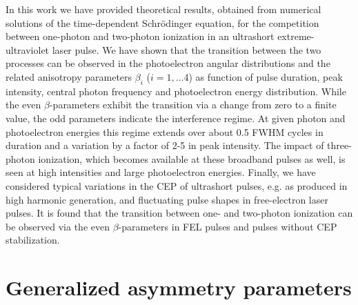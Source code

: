 In this work we have provided theoretical results, obtained from numerical solutions of the time-dependent Schr\"odinger equation, for the competition between one-photon and two-photon ionization in an ultrashort extreme-ultraviolet laser pulse. We have shown that the transition between the two processes can be observed in the photoelectron angular distributions and the related anisotropy parameters $\beta_i$ ($i = 1, \ldots 4$) as function of pulse duration, peak intensity, central photon frequency and photoelectron energy distribution. While the even $\beta$-parameters exhibit the transition via a change from zero to a finite value, the odd parameters indicate the interference regime. At given photon and photoelectron energies this regime extends over about 0.5 FWHM cycles in duration and a variation by a factor of 2-5 in peak intensity. The impact of three-photon ionization, which becomes available at these broadband pulses as well, is seen at high intensities and large photoelectron energies. Finally, we have considered typical variations in the CEP of ultrashort pulses, e.g. as produced in high harmonic generation, and fluctuating pulse shapes in free-electron laser pulses. It is found that the transition between one- and two-photon ionization can be observed via the even $\beta$-parameters in FEL pulses and pulses without CEP stabilization.


\section{Generalized asymmetry parameters} %
\label{sec:generalized_asymmetry_parameters}



